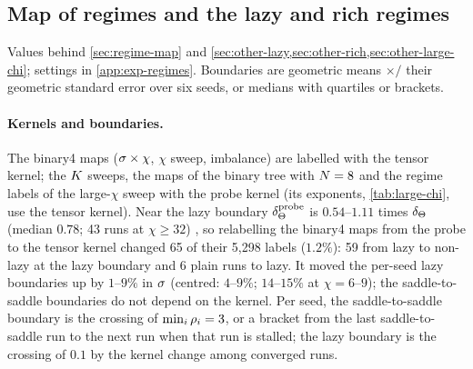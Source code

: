 \subsection{Map of regimes and the lazy and rich regimes}\label{app:D-regimes}

Values behind \cref{sec:regime-map} and \cref{sec:other-lazy,sec:other-rich,sec:other-large-chi}; settings in
\cref{app:exp-regimes}. Boundaries are geometric means $\times/$ their geometric standard error over six seeds,
or medians with quartiles or brackets.

\paragraph{Kernels and boundaries.}
The binary4 maps ($\sigma\times\chi$, $\chi$ sweep, imbalance) are labelled with the tensor kernel; the $K$ sweeps,
the maps of the binary tree with $N=8$ and the regime labels of the large-$\chi$ sweep with the probe kernel (its
exponents, \cref{tab:large-chi}, use the tensor kernel). Near the lazy boundary
$\delta_{\Theta}^{\rm probe}$ is $0.54$--$1.11$ times $\delta_{\Theta}$ (median $0.78$; 43 runs at $\chi\ge32$) \empirical, so relabelling the
binary4 maps from the probe to the tensor kernel changed 65 of their 5,298 labels ($1.2\%$): 59 from lazy to
non-lazy at the lazy boundary and 6 plain runs to lazy. It moved the per-seed lazy boundaries up by $1$--$9\%$ in
$\sigma$ (centred: $4$--$9\%$; $14$--$15\%$ at $\chi=6$--$9$); the saddle-to-saddle boundaries do not depend on the
kernel. Per seed, the saddle-to-saddle boundary is the
crossing of $\min_i\rho_{i}=3$, or a bracket from the last saddle-to-saddle run to the next run when that run is
stalled; the lazy boundary is the crossing of $0.1$ by the kernel change among converged runs.

